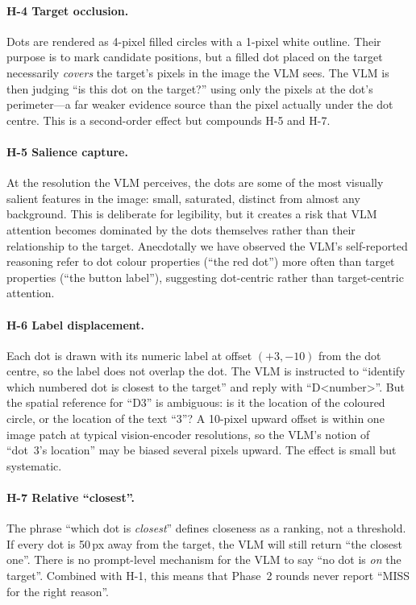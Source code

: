 \paragraph{H-4 Target occlusion.}
Dots are rendered as 4-pixel filled circles with a 1-pixel white
outline.  Their purpose is to mark candidate positions, but a
filled dot placed on the target necessarily \emph{covers} the
target's pixels in the image the VLM sees.  The VLM is then judging
``is this dot on the target?'' using only the pixels at the dot's
perimeter---a far weaker evidence source than the pixel actually
under the dot centre.  This is a second-order effect but compounds
H-5 and H-7.

\paragraph{H-5 Salience capture.}
At the resolution the VLM perceives, the dots are some of the most
visually salient features in the image: small, saturated, distinct
from almost any background.  This is deliberate for legibility, but
it creates a risk that VLM attention becomes dominated by the dots
themselves rather than their relationship to the target.  Anecdotally
we have observed the VLM's self-reported reasoning refer to dot
colour properties (``the red dot'') more often than target properties
(``the button label''), suggesting dot-centric rather than
target-centric attention.

\paragraph{H-6 Label displacement.}
Each dot is drawn with its numeric label at offset $(+3, -10)$ from
the dot centre, so the label does not overlap the dot.  The VLM is
instructed to ``identify which numbered dot is closest to the target''
and reply with ``D\textless number\textgreater''.  But the spatial
reference for ``D3'' is ambiguous: is it the location of the coloured
circle, or the location of the text ``3''?  A 10-pixel upward offset
is within one image patch at typical vision-encoder resolutions, so
the VLM's notion of ``dot~3's location'' may be biased several pixels
upward.  The effect is small but systematic.

\paragraph{H-7 Relative ``closest''.}
The phrase ``which dot is \emph{closest}'' defines closeness as a
ranking, not a threshold.  If every dot is 50\,px away from the
target, the VLM will still return ``the closest one''.  There is no
prompt-level mechanism for the VLM to say ``no dot is \emph{on} the
target''.  Combined with H-1, this means that Phase~2 rounds never
report ``MISS for the right reason''.

